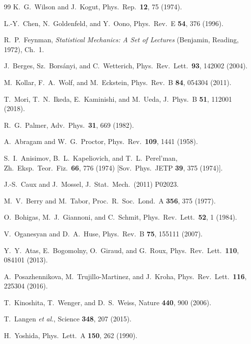 \documentclass[10pt,a4paper]{article}
\begin{document}
\begin{thebibliography}{99}
K.~G.~Wilson and J.~Kogut, Phys.\ Rep.\ \textbf{12}, 75 (1974).

L.-Y.~Chen, N.~Goldenfeld, and Y.~Oono, Phys.\ Rev.\ E \textbf{54}, 376 (1996).

R.~P.~Feynman, \textit{Statistical Mechanics: A Set of Lectures} (Benjamin, Reading, 1972), Ch.~1.

J.~Berges, Sz.~Bors\'anyi, and C.~Wetterich, Phys.\ Rev.\ Lett.\ \textbf{93}, 142002 (2004).

M.~Kollar, F.~A.~Wolf, and M.~Eckstein, Phys.\ Rev.\ B \textbf{84}, 054304 (2011).

T.~Mori, T.~N.~Ikeda, E.~Kaminishi, and M.~Ueda, J.~Phys.\ B \textbf{51}, 112001 (2018).

R.~G.~Palmer, Adv.\ Phys.\ \textbf{31}, 669 (1982).

A.~Abragam and W.~G.~Proctor, Phys.\ Rev.\ \textbf{109}, 1441 (1958).

S.~I.~Anisimov, B.~L.~Kapeliovich, and T.~L.~Perel'man, Zh.\ Eksp.\ Teor.\ Fiz.\ \textbf{66}, 776 (1974) [Sov.\ Phys.\ JETP \textbf{39}, 375 (1974)].

J.-S.~Caux and J.~Mossel, J.~Stat.\ Mech.\ (2011) P02023.

M.~V.~Berry and M.~Tabor, Proc.\ R.\ Soc.\ Lond.\ A \textbf{356}, 375 (1977).

O.~Bohigas, M.~J.~Giannoni, and C.~Schmit, Phys.\ Rev.\ Lett.\ \textbf{52}, 1 (1984).

V.~Oganesyan and D.~A.~Huse, Phys.\ Rev.\ B \textbf{75}, 155111 (2007).

Y.~Y.~Atas, E.~Bogomolny, O.~Giraud, and G.~Roux, Phys.\ Rev.\ Lett.\ \textbf{110}, 084101 (2013).

A.~Posazhennikova, M.~Trujillo-Martinez, and J.~Kroha, Phys.\ Rev.\ Lett.\ \textbf{116}, 225304 (2016).

T.~Kinoshita, T.~Wenger, and D.~S.~Weiss, Nature \textbf{440}, 900 (2006).

T.~Langen \textit{et al.}, Science \textbf{348}, 207 (2015).

H.~Yoshida, Phys.\ Lett.\ A \textbf{150}, 262 (1990).


\end{thebibliography}
\end{document}
